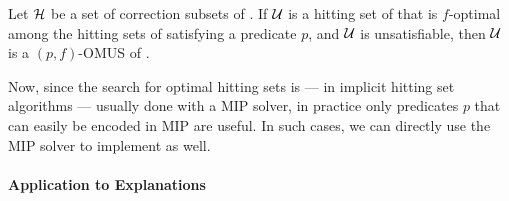 \begin{proposition}\label{prop:K}
  Let $\mathcal{H}$ be a set of correction subsets of \mcses{\formula}. 
  If $\mathcal{U}$ is a hitting set of  that is $f$-optimal among the hitting sets of  satisfying a predicate $p$, and  $\mathcal{U}$ is unsatisfiable, then $\mathcal{U}$ is a $(p,f)$-OMUS of \formula. 
\end{proposition}

Now, since the search for optimal hitting sets is --- in implicit hitting set algorithms --- usually done with a MIP solver, in practice only predicates $p$ that can easily be encoded in MIP are useful. In such cases, we can directly use the MIP solver to implement \cohs as well. 

\paragraph{Application to Explanations}


